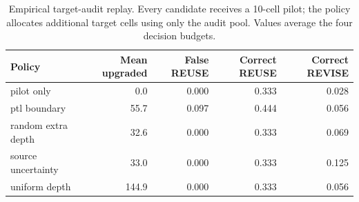 \begin{table}[H]
\centering
\scriptsize
\caption{Empirical target-audit replay. Every candidate receives a 10-cell pilot; the policy allocates additional target cells using only the audit pool. Values average the four decision budgets.}
\label{tab:target-audit}
\begin{tabular}{lrrrr}
\toprule
Policy & Mean upgraded & False REUSE & Correct REUSE & Correct REVISE \\
\midrule
pilot only & 0.0 & 0.000 & 0.333 & 0.028 \\
ptl boundary & 55.7 & 0.097 & 0.444 & 0.056 \\
random extra depth & 32.6 & 0.000 & 0.333 & 0.069 \\
source uncertainty & 33.0 & 0.000 & 0.333 & 0.125 \\
uniform depth & 144.9 & 0.000 & 0.333 & 0.056 \\
\bottomrule
\end{tabular}
\end{table}
